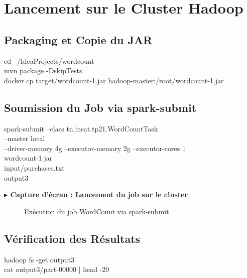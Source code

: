 \documentclass[12pt,a4paper]{report}
\newcommand{\etape}[1]{\vspace{6pt}\textbf{\color{bleuESP}$\blacktriangleright$ #1}\vspace{4pt}}
\begin{document}
\section{Lancement sur le Cluster Hadoop}

\subsection{Packaging et Copie du JAR}

\begin{cmdbox}
cd ~/IdeaProjects/wordcount \\
mvn package -DskipTests \\
docker cp target/wordcount-1.jar hadoop-master:/root/wordcount-1.jar
\end{cmdbox}

\subsection{Soumission du Job via spark-submit}

\begin{cmdbox}
spark-submit --class tn.insat.tp21.WordCountTask \\
  --master local \\
  --driver-memory 4g --executor-memory 2g --executor-cores 1 \\
  wordcount-1.jar \\
  input/purchases.txt \\
  output3
\end{cmdbox}

\etape{Capture d'écran : Lancement du job sur le cluster}
\begin{figure}[H]
  \centering
  \caption{Exécution du job WordCount via spark-submit}
\end{figure}

\subsection{Vérification des Résultats}

\begin{cmdbox}
hadoop fs -get output3 \\
cat output3/part-00000 | head -20
\end{cmdbox}
\end{document}

